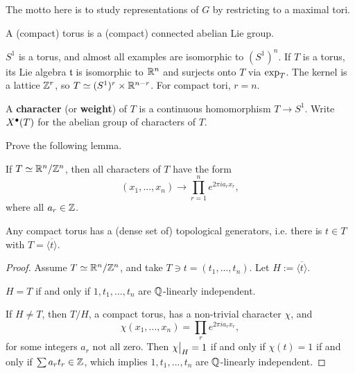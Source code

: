 The motto here is to study representations of $G$ by restricting to a maximal
tori.

\begin{defn}
A (compact) torus is a (compact) connected abelian Lie group.
\end{defn}

\begin{exmpl}
$S^1$ is a torus, and almost all examples are isomorphic to $(S^1)^n$. If $T$ 
is a  torus, its Lie algebra $\mathfrak{t}$ is isomorphic to $\mathbb{R}^n$ and 
surjects onto $T$ via $\operatorname{exp}_T$. The kernel is a lattice $\mathbb{Z}^r$, so
$T \simeq (S^1)^{r} \times \mathbb{R}^{n - r}$. For compact tori, $r = n$.
\end{exmpl}

\begin{defn}
A \textbf{character} (or \textbf{weight}) of $T$ is a continuous homomorphism
$T \rightarrow S^1$. Write $X^\bullet(T)$ for the abelian group of characters of
$T$.
\end{defn}

\begin{ex}
Prove the following lemma.
\begin{lem}
If $T \simeq \mathbb{R}^n/\mathbb{Z}^n$, then all characters of $T$ have the form
\[ (x_1, ..., x_n) \rightarrow \prod_{r = 1}^n e^{2 \pi i a_r x_r}, \]
where all $a_r \in \mathbb{Z}$.
\end{lem}
\end{ex}

\begin{lem}
Any compact torus has a (dense set of) topological generators, i.e. there is
$t \in T$ with $T = \overline{\langle t \rangle}.$
\end{lem}

\begin{proof}
Assume $T \simeq \mathbb{R}^n/\mathbb{Z}^n$, and take $T \ni t = (t_1, ..., t_n)$. Let
$H := \overline{\langle t \rangle}$.

\begin{lem}
$H = T$ if and only if $1, t_1, ..., t_n$ are $\mathbb{Q}$-linearly independent.
\end{lem}

If $H \neq T$, then $T/H$, a compact torus, has a non-trivial character $\chi$,
and \[ \chi(x_1, ..., x_n) = \prod_r e^{2 \pi i a_r x_r}, \]  for some integers
$a_r$ not all zero. Then $\restr{\chi}{H} = 1$ if and only if $\chi(t) = 1$
if and only if $\sum a_r t_r \in \mathbb{Z}$, which implies $1, t_1, ..., t_n$ are
$\mathbb{Q}$-linearly independent.
\end{proof}

